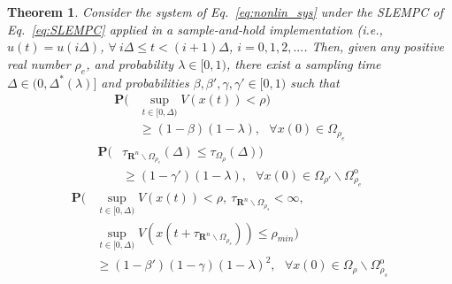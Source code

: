\documentclass[letterpaper, 10pt, conference]{ieeeconf}
\newtheorem{thm}{Theorem}
\begin{document}
\begin{thm}\label{thm4}
	Consider the system of Eq.~\ref{eq:nonlin_sys} under the SLEMPC of Eq.~\ref{eq:SLEMPC} applied in a sample-and-hold implementation (i.e., $u(t)=u(i \Delta)$, $\forall ~i \Delta \leq t < (i+1) \Delta$, $i=0,1,2,...$. Then, given any positive real number $\rho_e$, and probability $\lambda \in [0,1)$, there exist a sampling time  $\Delta \in (0,\Delta^*(\lambda)]$ and probabilities $\beta, \beta', \gamma, \gamma' \in [0,1)$ such that
	\begin{equation}\label{eq:mode1_stochastic}
\begin{split}
\mathbf{P}(&\sup \limits_{t \in [0, \Delta)}V(x(t)) < \rho )\\
&\geq (1-\beta)(1- \lambda),~~~\forall x(0) \in \Omega_{\rho_e}
\end{split}	
\end{equation}	
\begin{equation} \label{eq:mode2_stochastic}
\begin{split}
\mathbf{P}( &\tau_{\mathbf{R}^n \backslash \Omega_{\rho_e}}(\Delta) \leq \tau_{\Omega_{\rho}}(\Delta) )\\
&\geq (1-\gamma')(1- \lambda),~~~\forall x(0) \in \Omega_{\rho'} \backslash \Omega_{\rho_e}^{\text{o}} %
\end{split}	
\end{equation}	
\begin{equation}
\label{eq:mode3_stochastic}
\begin{split}
\mathbf{P} (&\sup \limits_{t \in [0, \Delta)} V(x(t)) < \rho,~\tau_{\mathbf{R}^n \backslash \Omega_{\rho_s}} < \infty,\\
&\sup \limits_{t \in [0, \Delta)} V(x(t+\tau_{\mathbf{R}^n \backslash \Omega_{\rho_s}})) \leq \rho_{min})\\
&\geq (1-\beta')(1-\gamma)(1-\lambda)^2,~~~\forall x(0) \in \Omega_{\rho} \backslash \Omega_{\rho_s}^{\text{o}}
\end{split}
\end{equation}


\end{thm}
\end{document}
